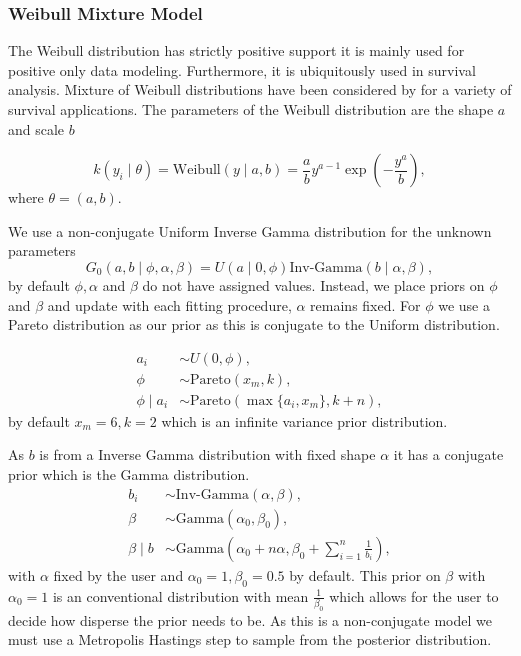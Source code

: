 \documentclass[nojss]{jss}
\begin{document}
\subsubsection{Weibull Mixture Model}
The Weibull distribution has strictly positive support it is mainly used for positive only data modeling. Furthermore, it is ubiquitously used in survival analysis. Mixture of Weibull distributions have been considered by \cite{kottas_dirichlet_2006} for a variety of survival applications.
The parameters of the Weibull distribution are the shape $a$ and scale $b$

\begin{equation}
k(y_i \mid \theta) = \text{Weibull} (y \mid a, b) = \frac{a}{b} y ^{a-1}  \exp \left( -  \frac{y^a}{b}  \right),
\end{equation}
where $\theta = ( a, b )$.

We use a non-conjugate Uniform Inverse Gamma distribution for the unknown parameters
\begin{equation}
G_0 (a, b \mid \phi, \alpha, \beta) = U(a \mid 0, \phi ) \text{Inv-Gamma} ( b \mid \alpha, \beta),
\end{equation}
by default $\phi, \alpha$ and $\beta$ do not have assigned values. Instead, we place priors on $\phi$ and $\beta$ and update with each fitting procedure, $\alpha$ remains fixed. For $\phi$ we use a Pareto distribution as our prior as this is conjugate to the Uniform distribution.

\begin{align*}
a_i & \sim U(0, \phi) ,\\
\phi & \sim \text{Pareto}(x_m , k), \\
\phi \mid a _i & \sim \text{Pareto}( \max \{ a_i , x_m \}, k + n),
\end{align*}
by default $x_m = 6, k=2$ which is an infinite variance prior distribution.

As $b$ is from a Inverse Gamma distribution with fixed shape $\alpha$ it has a conjugate prior which is the Gamma distribution.
\begin{align*}
b_i & \sim \text{Inv-Gamma} ( \alpha , \beta ), \\
\beta & \sim \text{Gamma} (\alpha _0 , \beta _0), \\
\beta \mid b & \sim \text{Gamma} \left( \alpha _0 + n \alpha , \beta _0 + \sum _{i=1} ^n \frac{1}{b_i} \right),
\end{align*}
with $\alpha$ fixed by the user and $ \alpha _0 = 1, \beta _0 = 0.5$ by default. This prior on $\beta$ with $\alpha _0=1$ is an conventional distribution with mean $\frac{1}{\beta _0}$ which allows for the user to decide how disperse the prior needs to be. As this is a non-conjugate model we must use a Metropolis Hastings step to sample from the posterior distribution.
\end{document}
